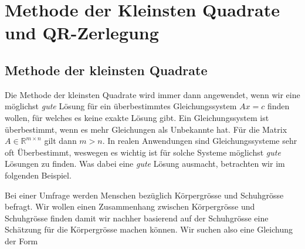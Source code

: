 \setcounter{section}{8}
\section{Methode der Kleinsten Quadrate und QR-Zerlegung}

\subsection{Methode der kleinsten Quadrate}

Die Methode der kleinsten Quadrate wird immer dann angewendet, wenn wir eine möglichst \textit{gute} Lösung für ein überbestimmtes Gleichungssystem \( Ax = c\) finden wollen, für welches es keine exakte Lösung gibt. Ein Gleichungssystem ist überbestimmt, wenn es mehr Gleichungen als Unbekannte hat. Für die Matrix \( A \in \mathbb{R}^{m \times n} \) gilt dann \(m > n \). In realen Anwendungen sind Gleichungssysteme sehr oft Überbestimmt, weswegen es wichtig ist für solche Systeme möglichst \textit{gute} Lösungen zu finden. Was dabei eine \textit{gute} Lösung ausmacht, betrachten wir im folgenden Beispiel. 

\vspace{1\baselineskip}

Bei einer Umfrage werden Menschen bezüglich Körpergrösse und Schuhgrösse befragt. Wir wollen einen Zusammenhang zwischen Körpergrösse und Schuhgrösse finden damit wir nachher basierend auf der Schuhgrösse eine Schätzung für die Körpergrösse machen können. Wir suchen also eine Gleichung der Form


